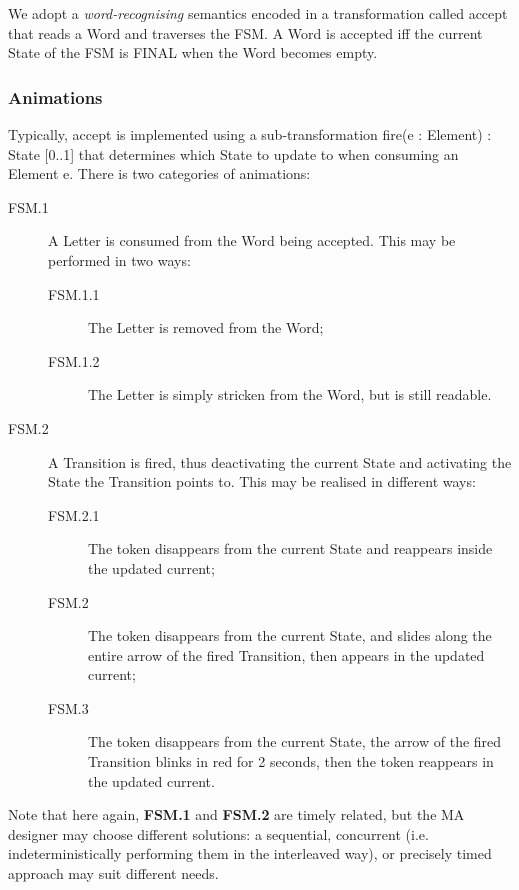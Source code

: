 We adopt a \emph{word-recognising} semantics encoded in a transformation called
\textsf{accept} that reads a \textsf{Word} and traverses the \textsf{FSM}. A 
\textsf{Word} is accepted iff the \textsf{current} \textsf{State} of the \textsf{FSM}
is \textsf{FINAL} when the \textsf{Word} becomes empty.

\subsubsection{Animations}
\label{sec:Examples:FSM:Animations}

Typically, \textsf{accept} is implemented using a sub-transformation 
\textsf{fire(e : Element) : State [0..1]} that determines which \textsf{State} 
to update to when consuming an \textsf{Element} \textsf{e}.
There is two categories of animations:
\begin{description}
   \item[FSM.1] A \textsf{Letter} is consumed from the \textsf{Word} being 
   accepted. This may be performed in two ways:
   \begin{description}
      \item[FSM.1.1] The \textsf{Letter} is removed from the \textsf{Word};
      \item[FSM.1.2] The \textsf{Letter} is simply stricken from the \textsf{Word},
      but is still readable.
   \end{description}
   \item[FSM.2] A \textsf{Transition} is fired, thus deactivating the current
   \textsf{State} and activating the \textsf{State} the \textsf{Transition} points to.
   This may be realised in different ways:
   \begin{description}
      \item[FSM.2.1] The token disappears from the \textsf{current} \textsf{State}
      and reappears inside the updated \textsf{current}; 
      \item[FSM.2] The token disappears from the \textsf{current} \textsf{State},
      and slides along the entire arrow of the fired \textsf{Transition}, then 
      appears in the updated \textsf{current};
      \item[FSM.3] The token disappears from the \textsf{current} \textsf{State},
      the arrow of the fired \textsf{Transition} blinks in red for 2 seconds, 
      then the token reappears in the updated \textsf{current}.
   \end{description}
\end{description}
Note that here again, \textbf{FSM.1} and \textbf{FSM.2} are timely related, but 
the MA designer may choose different solutions: a sequential, concurrent (i.e.
indeterministically performing them in the interleaved way), or precisely timed
approach may suit different needs.

